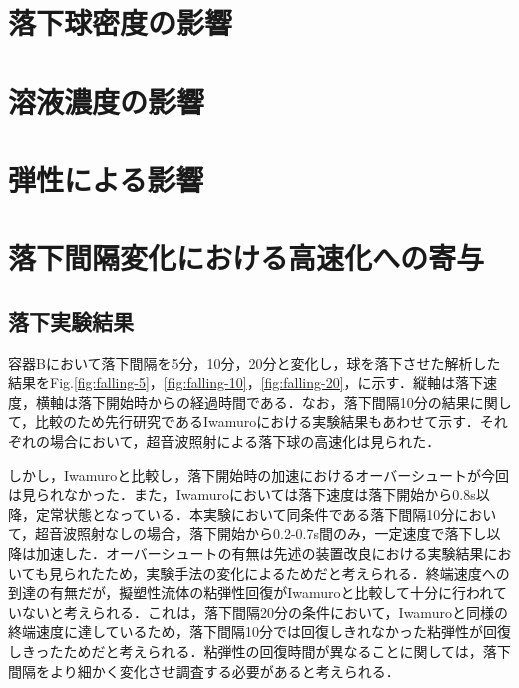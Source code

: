 \section{落下球密度の影響}

\section{溶液濃度の影響}

\section{弾性による影響}

\section{落下間隔変化における高速化への寄与}
\subsection{落下実験結果}

容器Bにおいて落下間隔を5分，10分，20分と変化し，球を落下させた解析した結果をFig.\ref{fig:falling-5}，\ref{fig:falling-10}，\ref{fig:falling-20}，に示す．縦軸は落下速度，横軸は落下開始時からの経過時間である．なお，落下間隔10分の結果に関して，比較のため先行研究であるIwamuro\cite{ref:9}における実験結果もあわせて示す．それぞれの場合において，超音波照射による落下球の高速化は見られた．

しかし，Iwamuro\cite{ref:9}と比較し，落下開始時の加速におけるオーバーシュートが今回は見られなかった．また，Iwamuro\cite{ref:9}においては落下速度は落下開始から0.8s以降，定常状態となっている．本実験において同条件である落下間隔10分において，超音波照射なしの場合，落下開始から0.2-0.7s間のみ，一定速度で落下し以降は加速した．オーバーシュートの有無は先述の装置改良における実験結果においても見られたため，実験手法の変化によるためだと考えられる．終端速度への到達の有無だが，擬塑性流体の粘弾性回復がIwamuro\cite{ref:9}と比較して十分に行われていないと考えられる．これは，落下間隔20分の条件において，Iwamuro\cite{ref:9}と同様の終端速度に達しているため，落下間隔10分では回復しきれなかった粘弾性が回復しきったためだと考えられる．粘弾性の回復時間が異なることに関しては，落下間隔をより細かく変化させ調査する必要があると考えられる．

